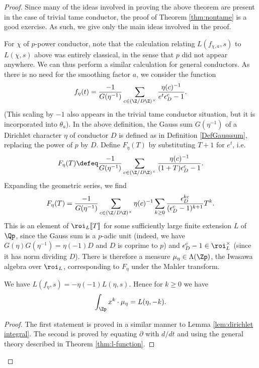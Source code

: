 \documentclass[a4paper,10pt, english, reqno]{smfart}
\newcommand{\lsem}{[\! [}
\newcommand{\rsem}{]\! ]}
\numberwithin{equation}{section}
\begin{document}
\begin{proof}
Since many of the ideas involved in proving the above theorem are present in the case of trivial tame conductor, the proof of Theorem \ref{thm:nontame} is a good exercise.  As such, we give only the main ideas involved in the proof. 

For $\chi$ of $p$-power conductor, note that the calculation relating $L(f_{\chi,a},s)$ to $L(\chi,s)$ above was entirely classical, in the sense that $p$ did not appear anywhere. We can thus perform a similar calculation for general conductors. As there is no need for the smoothing factor $a$, we consider the function
\begin{equation*}
f_\eta(t) = \frac{-1}{G(\eta^{-1})}\sum_{c \in (\Z/D\Z)^\times} \frac{\eta(c)^{-1}}{e^t\epsilon_{D}^c - 1}.
\end{equation*}
(This scaling by $-1$ also appears in the trivial tame conductor situation, but it is incorporated into $\theta_a$).  In the above definition, the Gauss sum $G(\eta^{-1})$ of a Dirichlet character $\eta$ of conductor $D$ is defined as in Definition \ref{DefGausssum}, replacing the power of $p$ by $D$. Define $F_\eta(T)$ by substituting $T+1$ for $e^t$, i.e.
\begin{equation} \label{EquationFeta}
    F_{\eta}(T) \defeq \frac{-1}{G(\eta^{-1})}\sum_{c \in (\Z/D\Z)^\times} \frac{\eta(c)^{-1}}{(1 + T)\epsilon_{D}^c - 1}.
\end{equation}
Expanding the geometric series, we find
\[F_{\eta}(T) = \frac{-1}{G(\eta^{-1})}\sum_{c\in(\Z/D\Z)^\times} \eta(c)^{-1}\sum_{k\geq 0}\frac{\epsilon_D^{kc}}{(\epsilon_D^c - 1)^{k+1}}T^k.\]
This is an element of $\roi_L\lsem T\rsem $ for some sufficiently large finite extension $L$ of $\Qp$, since the Gauss sum is a $p$-adic unit (indeed, we have $G(\eta)G(\eta^{-1}) = \eta(-1)D$ and $D$ is coprime to $p$) and $\epsilon_D^c -1 \in \roi_L^\times$ (since it has norm dividing $D$). There is therefore a measure $\mu_{\eta} \in \Lambda(\Zp)$, the Iwasawa algebra over $\roi_L$, corresponding to $F_{\eta}$ under the Mahler transform. 


\begin{lemma}\label{lem:non-trivial}
We have $L(f_\eta,s) = -\eta(-1)L(\eta,s).$ Hence for $k \geq 0$ we have
\[\int_{\Zp}x^k \cdot\mu_\eta = L(\eta,-k).\]
\end{lemma}
\begin{proof}
The first statement is proved in a similar manner to Lemma \ref{lem:dirichlet integral}. The second is proved by equating $\partial$ with $d/dt$ and using the general theory described in Theorem \ref{thm:l-function}.
\end{proof}


\end{proof}
\end{document}
